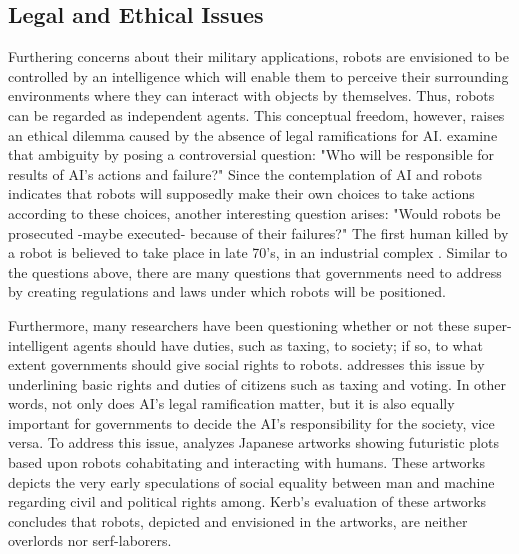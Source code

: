 \documentclass[man]{apa6}
\begin{document}
\subsection{Legal and Ethical Issues}
Furthering concerns about their military applications, robots are envisioned to be controlled by an intelligence which will enable them to perceive their surrounding environments where they can interact with objects by themselves.
Thus, robots can be regarded as independent agents.
This conceptual freedom, however, raises an ethical dilemma caused by the absence of legal ramifications for AI.
 examine that ambiguity by posing a controversial question: "Who will be responsible for results of AI's actions and failure?"
Since the contemplation of AI and robots indicates that robots will supposedly make their own choices to take actions according to these choices, another interesting question arises: "Would robots be prosecuted -maybe executed- because of their failures?"
The first human killed by a robot is believed to take place in late 70's, in an industrial complex \cite{lin}.
Similar to the questions above, there are many questions that governments need to address by creating regulations and laws under which robots will be positioned. \par
Furthermore, many researchers have been questioning whether or not these super-intelligent agents should have duties, such as taxing, to society; if so, to what extent governments should give social rights to robots.  addresses this issue by underlining basic rights and duties of citizens such as taxing and voting.
In other words, not only does AI's legal ramification matter, but it is also equally important for governments to decide the AI's responsibility for the society, vice versa.
To address this issue,  analyzes Japanese artworks showing futuristic plots based upon robots cohabitating and interacting with humans.
These artworks depicts the very early speculations of social equality between man and machine regarding civil and political rights among.
Kerb's evaluation of these artworks concludes that robots, depicted and envisioned in the artworks, are neither overlords nor serf-laborers. 
\end{document}
